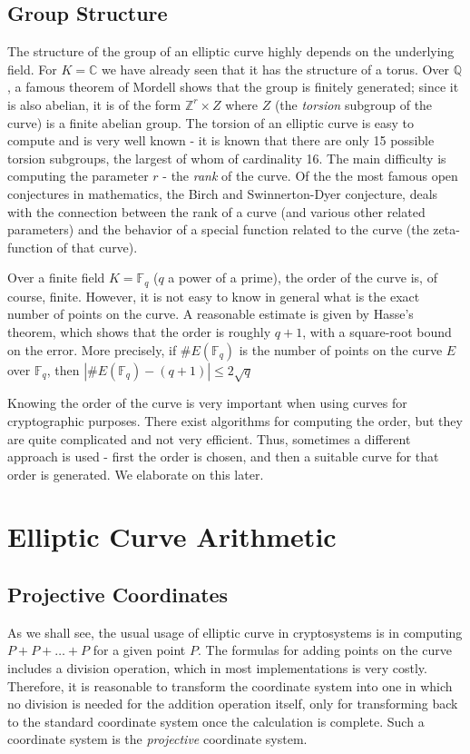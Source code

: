 \documentclass[11pt,english]{article}
\begin{document}
\subsection{Group Structure}
The structure of the group of an elliptic curve highly depends on the underlying field. For $K=\mathbb{C}$ we have already seen that it has the structure of a torus.
Over $\mathbb{Q}$, a famous theorem of Mordell shows that the group is finitely generated; since it is also abelian, it is of the form $\mathbb{Z}^r\times Z$
where $Z$ (the \emph{torsion} subgroup of the curve) is a finite abelian group. The torsion of an elliptic curve is easy to compute and is very well known -
it is known that there are only 15 possible torsion subgroups, the largest of whom of cardinality 16. The main difficulty is computing the parameter
$r$ - the \emph{rank} of the curve. Of the the most famous open conjectures in mathematics, the Birch and Swinnerton-Dyer conjecture, deals
with the connection between the rank of a curve (and various other related parameters) and the behavior of a special function related to the curve (the
zeta-function of that curve).

Over a finite field $K=\mathbb{F}_q$ ($q$ a power of a prime), the order of the curve is, of course, finite. However, it is not easy to know in general
what is the exact number of points on the curve.  A reasonable estimate is given by Hasse's theorem, which shows that the order is roughly $q+1$, with
a square-root bound on the error. More precisely, if $\#E(\mathbb{F}_q)$ is the number of points on the curve $E$ over $\mathbb{F}_q$, then 
$|\#E(\mathbb{F}_q)-(q+1)|\le 2\sqrt{q}$

Knowing the order of the curve is very important when using curves for cryptographic purposes. There exist algorithms for computing the order, but
they are quite complicated and not very efficient. Thus, sometimes a different approach is used - first the order is chosen, and then a suitable curve
for that order is generated. We elaborate on this later.
\section{Elliptic Curve Arithmetic}
\subsection{Projective Coordinates}
\label{Projective Coordinates}
As we shall see, the usual usage of elliptic curve in cryptosystems is in computing $P+P+\dots+P$ for a given point $P$. 
The formulas for adding points on the curve includes a division operation, which in most implementations is very costly. Therefore, it is reasonable to
transform the coordinate system into one in which no division is needed for the addition operation itself, only for transforming back to the standard
coordinate system once the calculation is complete. Such a coordinate system is the \emph{projective} coordinate system.
\end{document}
